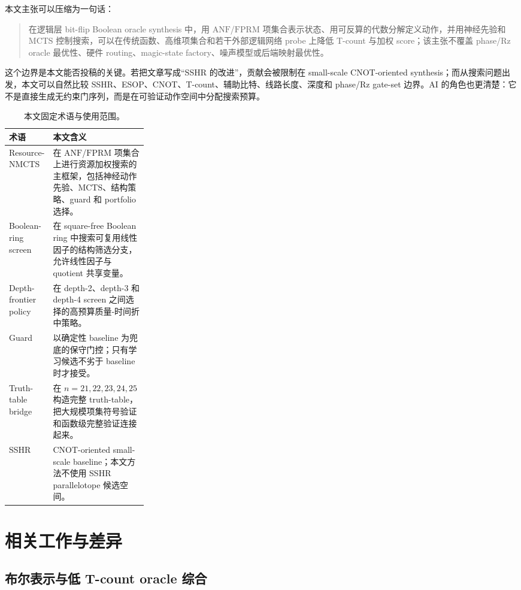 \documentclass[UTF8,fontset=macnew,11pt]{ctexart}
\newcommand{\method}{Resource-NMCTS}
\newcommand{\anf}{\ensuremath{\mathrm{ANF}}}
\newcommand{\fprm}{\ensuremath{\mathrm{FPRM}}}
\newcommand{\mcts}{\ensuremath{\mathrm{MCTS}}}
\newcommand{\ttable}{truth-table}
\begin{document}
本文主张可以压缩为一句话：

\begin{quote}
在逻辑层 bit-flip Boolean oracle synthesis 中，用 \anf{}/\fprm{} 项集合表示状态、用可反算的代数分解定义动作，并用神经先验和 \mcts{} 控制搜索，可以在传统函数、高维项集合和若干外部逻辑网络 probe 上降低 T-count 与加权 score；该主张不覆盖 phase/Rz oracle 最优性、硬件 routing、magic-state factory、噪声模型或后端映射最优性。
\end{quote}

这个边界是本文能否投稿的关键。若把文章写成“SSHR 的改进”，贡献会被限制在 small-scale CNOT-oriented synthesis；而从搜索问题出发，本文可以自然比较 SSHR、ESOP、CNOT、T-count、辅助比特、线路长度、深度和 phase/Rz gate-set 边界。AI 的角色也更清楚：它不是直接生成无约束门序列，而是在可验证动作空间中分配搜索预算。

\begin{table}[H]
\centering
\small
\caption{本文固定术语与使用范围。}
\label{tab:terms}
\begin{tabularx}{\linewidth}{>{\raggedright\arraybackslash}p{0.27\linewidth}>{\raggedright\arraybackslash}X}
\toprule
术语 & 本文含义 \\
\midrule
\method{} & 在 \anf{}/\fprm{} 项集合上进行资源加权搜索的主框架，包括神经动作先验、\mcts{}、结构策略、guard 和 portfolio 选择。 \\
Boolean-ring screen & 在 square-free Boolean ring 中搜索可复用线性因子的结构筛选分支，允许线性因子与 quotient 共享变量。 \\
Depth-frontier policy & 在 depth-2、depth-3 和 depth-4 screen 之间选择的高预算质量-时间折中策略。 \\
Guard & 以确定性 baseline 为兜底的保守门控；只有学习候选不劣于 baseline 时才接受。 \\
Truth-table bridge & 在 $n=21,22,23,24,25$ 构造完整 \ttable{}，把大规模项集符号验证和函数级完整验证连接起来。 \\
SSHR & CNOT-oriented small-scale baseline；本文方法不使用 SSHR parallelotope 候选空间。 \\
\bottomrule
\end{tabularx}
\end{table}

\section{相关工作与差异}

\subsection{布尔表示与低 T-count oracle 综合}
\end{document}
